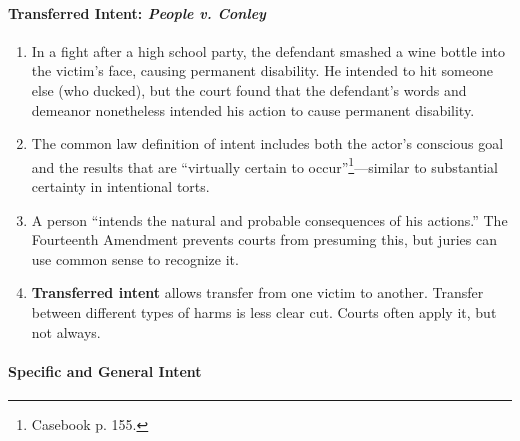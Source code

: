 \paragraph{Transferred Intent: \emph{People v. Conley}}

\begin{enumerate}
    \item In a fight after a high school party, the defendant smashed a wine 
    bottle into the victim's face, causing permanent disability. He intended 
    to hit someone else (who ducked), but the court found that the defendant's 
    words and demeanor nonetheless intended his action to cause permanent 
    disability.
    \item The common law definition of intent includes both the actor's 
    conscious goal and the results that are ``virtually certain to 
    occur''\footnote{Casebook p. 155.}---similar to substantial certainty in 
    intentional torts.
    \item A person ``intends the natural and probable consequences of his 
    actions.'' The Fourteenth Amendment prevents courts from presuming this, 
    but juries can use common sense to recognize it.
    \item \textbf{Transferred intent}  allows transfer from one victim to 
    another. Transfer between different types of harms is less clear cut.  
    Courts often apply it, but not always.
\end{enumerate}

\paragraph{Specific and General Intent}

